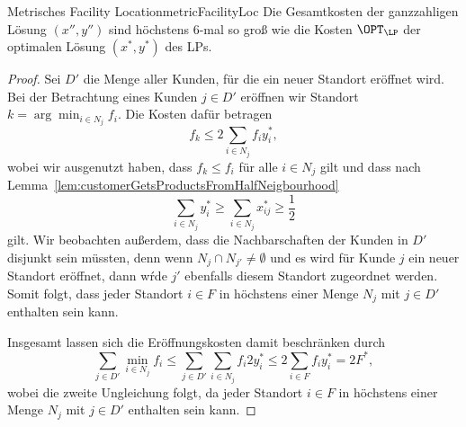 \documentclass[language=ngerman,algolist]{TemplateLecture}
\begin{document}
\begin{thm}{Metrisches Facility Location}{metricFacilityLoc}
    Die Gesamtkosten der ganzzahligen Lösung $(x'', y'')$ sind höchstens $6$-mal so groß wie die Kosten $\OPT_{\LP}$ der optimalen Lösung $(x^*, y^*)$ des LPs.
\end{thm}

\begin{proof}
    Sei $D'$ die Menge aller Kunden, für die ein neuer Standort eröffnet wird. Bei der Betrachtung eines Kunden $j \in D'$ eröffnen wir Standort $k = \arg\min_{i \in N_j} f_i$. Die Kosten dafür betragen
    \begin{equation*}
        f_k \leq 2\sum_{i \in N_j} f_i y_i^*,
    \end{equation*}
    wobei wir ausgenutzt haben, dass $f_k \leq f_i$ für alle $i \in N_j$ gilt und dass nach Lemma~\ref{lem:customerGetsProductsFromHalfNeigbourhood} 
    \begin{equation*}
        \sum_{i \in N_j} y_i^* \geq \sum_{i \in N_j} x_{ij}^* \geq \frac{1}{2}
    \end{equation*}
    gilt. Wir beobachten außerdem, dass die Nachbarschaften der Kunden in $D'$ disjunkt sein müssten, denn wenn $N_j \cap N_{j'} \neq \emptyset$ und es wird für Kunde $j$ ein neuer Standort eröffnet, dann wŕde $j'$ ebenfalls diesem Standort zugeordnet werden. Somit folgt, dass jeder Standort $i \in F$ in höchstens einer Menge $N_j$ mit $j \in D'$ enthalten sein kann. 

    Insgesamt lassen sich die Eröffnungskosten damit beschränken durch 
    \begin{equation*}
        \sum_{j \in D'} \min_{i \in N_j} f_i \leq \sum_{j \in D'} \sum_{i \in N_j} f_i 2y_i^* \leq 2\sum_{i \in F} f_i y_i^* = 2F^*,
    \end{equation*}
    wobei die zweite Ungleichung folgt, da jeder Standort $i \in F$ in höchstens einer Menge $N_j$ mit $j \in D'$ enthalten sein kann.


\end{proof}
\end{document}
